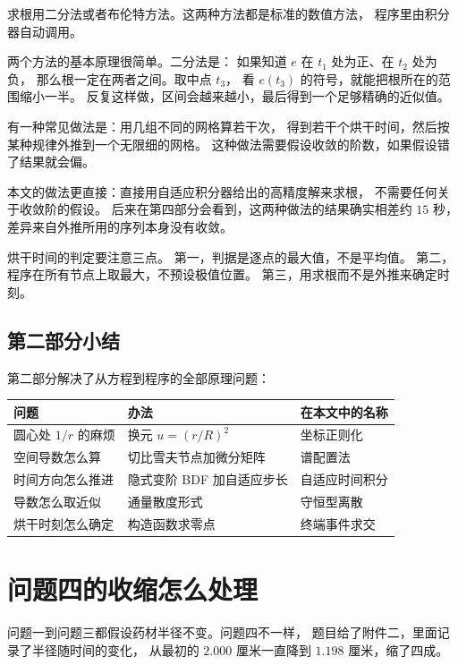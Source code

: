 求根用二分法或者布伦特方法。这两种方法都是标准的数值方法，
程序里由积分器自动调用。

两个方法的基本原理很简单。二分法是：
如果知道 $e$ 在 $t_1$ 处为正、在 $t_2$ 处为负，
那么根一定在两者之间。取中点 $t_3$，
看 $e(t_3)$ 的符号，就能把根所在的范围缩小一半。
反复这样做，区间会越来越小，最后得到一个足够精确的近似值。

有一种常见做法是：用几组不同的网格算若干次，
得到若干个烘干时间，然后按某种规律外推到一个无限细的网格。
这种做法需要假设收敛的阶数，如果假设错了结果就会偏。

本文的做法更直接：直接用自适应积分器给出的高精度解来求根，
不需要任何关于收敛阶的假设。
后来在第四部分会看到，这两种做法的结果确实相差约 $15$ 秒，
差异来自外推所用的序列本身没有收敛。

\keypoint
烘干时间的判定要注意三点。
第一，判据是逐点的最大值，不是平均值。
第二，程序在所有节点上取最大，不预设极值位置。
第三，用求根而不是外推来确定时刻。

\subsection{第二部分小结}

第二部分解决了从方程到程序的全部原理问题：

\begin{center}
\begin{tabular}{@{}lll@{}}
\toprule
问题 & 办法 & 在本文中的名称 \\
\midrule
圆心处 $1/r$ 的麻烦 & 换元 $u=(r/R)^2$ & 坐标正则化 \\
空间导数怎么算 & 切比雪夫节点加微分矩阵 & 谱配置法 \\
时间方向怎么推进 & 隐式变阶 BDF 加自适应步长 & 自适应时间积分 \\
导数怎么取近似 & 通量散度形式 & 守恒型离散 \\
烘干时刻怎么确定 & 构造函数求零点 & 终端事件求交 \\
\bottomrule
\end{tabular}
\end{center}

\section{问题四的收缩怎么处理}

问题一到问题三都假设药材半径不变。问题四不一样，
题目给了附件二，里面记录了半径随时间的变化，
从最初的 $2.000$ 厘米一直降到 $1.198$ 厘米，缩了四成。

